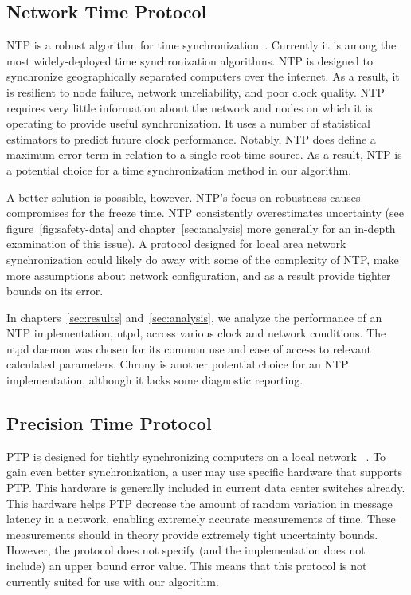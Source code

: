 \subsection{Network Time Protocol}

NTP is a robust algorithm for time
synchronization~\citep{Burbank2010}. Currently it is among the most
widely-deployed time synchronization algorithms. NTP is designed to
synchronize geographically separated computers over the internet. As a
result, it is resilient to node failure, network unreliability, and
poor clock quality. NTP requires very little information about the
network and nodes on which it is operating to provide useful
synchronization. It uses a number of statistical estimators to predict
future clock performance. Notably, NTP does define a maximum error
term in relation to a single root time source. As a result, NTP is a
potential choice for a time synchronization method in our algorithm.

A better solution is possible, however. NTP's focus on robustness
causes compromises for the freeze time. NTP consistently overestimates
uncertainty (see figure~\ref{fig:safety-data} and
chapter~\ref{sec:analysis} more generally for an in-depth examination of
this issue). A protocol designed for local area network
synchronization could likely do away with some of the complexity of
NTP, make more assumptions about network configuration, and as a
result provide tighter bounds on its error.

In chapters~\ref{sec:results} and~\ref{sec:analysis}, we analyze the
performance of an NTP implementation, ntpd, across various clock and
network conditions. The ntpd daemon was chosen for its common use and
ease of access to relevant calculated parameters. Chrony is another
potential choice for an NTP implementation, although it lacks some
diagnostic reporting. %

\subsection{Precision Time Protocol}

PTP is designed for tightly synchronizing computers on a local network
~\citeyearpar{2008}. To gain even better synchronization, a user may use
specific hardware that supports PTP. This hardware is generally
included in current data center switches already. This hardware helps
PTP decrease the amount of random variation in message latency in a
network, enabling extremely accurate measurements of time. These
measurements should in theory provide extremely tight uncertainty
bounds. However, the protocol does not specify (and the implementation
does not include) an upper bound error value. This means that this
protocol is not currently suited for use with our algorithm.

